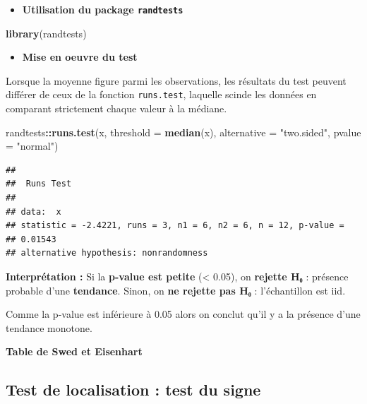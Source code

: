 \documentclass[
  12pt,
]{article}
\newenvironment{Shaded}{\begin{snugshade}}{\end{snugshade}}
\newcommand{\AttributeTok}[1]{\textcolor[rgb]{0.13,0.29,0.53}{#1}}
\newcommand{\FunctionTok}[1]{\textcolor[rgb]{0.13,0.29,0.53}{\textbf{#1}}}
\newcommand{\NormalTok}[1]{#1}
\newcommand{\SpecialCharTok}[1]{\textcolor[rgb]{0.81,0.36,0.00}{\textbf{#1}}}
\newcommand{\StringTok}[1]{\textcolor[rgb]{0.31,0.60,0.02}{#1}}
\providecommand{\tightlist}{%
  \setlength{\itemsep}{0pt}\setlength{\parskip}{0pt}}
\begin{document}
\begin{itemize}
\tightlist
\item
  \textbf{Utilisation du package \texttt{randtests}}
\end{itemize}

\begin{Shaded}
\begin{Highlighting}[]
\FunctionTok{library}\NormalTok{(randtests)}
\end{Highlighting}
\end{Shaded}

\begin{itemize}
\tightlist
\item
  \textbf{Mise en oeuvre du test}
\end{itemize}

Lorsque la moyenne figure parmi les observations, les résultats du test
peuvent différer de ceux de la fonction \texttt{runs.test}, laquelle
scinde les données en comparant strictement chaque valeur à la médiane.

\begin{Shaded}
\begin{Highlighting}[]
\NormalTok{randtests}\SpecialCharTok{::}\FunctionTok{runs.test}\NormalTok{(x, }\AttributeTok{threshold =} \FunctionTok{median}\NormalTok{(x),}
                     \AttributeTok{alternative =} \StringTok{"two.sided"}\NormalTok{, }\AttributeTok{pvalue =} \StringTok{"normal"}\NormalTok{)}
\end{Highlighting}
\end{Shaded}

\begin{verbatim}
## 
##  Runs Test
## 
## data:  x
## statistic = -2.4221, runs = 3, n1 = 6, n2 = 6, n = 12, p-value =
## 0.01543
## alternative hypothesis: nonrandomness
\end{verbatim}

\textbf{Interprétation : } Si la \textbf{p-value est petite}
(\textless{} 0.05), on \textbf{rejette H₀} : présence probable d'une
\textbf{tendance}. Sinon, on \textbf{ne rejette pas H₀} : l'échantillon
est iid.

Comme la p-value est inférieure à 0.05 alors on conclut qu'il y a la
présence d'une tendance monotone.

\textbf{Table de Swed et Eisenhart}



\subsection{Test de localisation : test du
signe}\label{test-de-localisation-test-du-signe}
\end{document}
